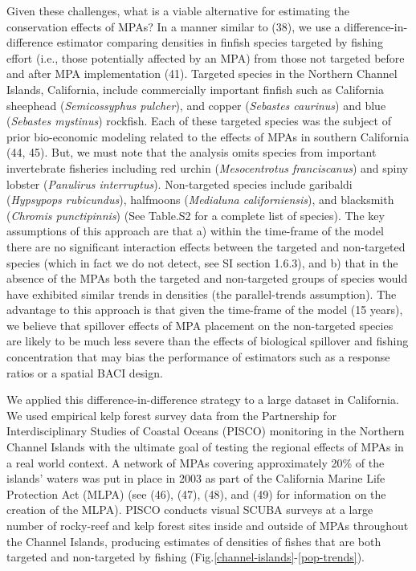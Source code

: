 \documentclass[9pt,twocolumn,twoside,lineno]{pnas-new}
\begin{document}
Given these challenges, what is a viable alternative for estimating the
conservation effects of MPAs? In a manner similar to (38), we use a
difference-in-difference estimator comparing densities in finfish
species targeted by fishing effort (i.e., those potentially affected by
an MPA) from those not targeted before and after MPA implementation
(41). Targeted species in the Northern Channel Islands, California,
include commercially important finfish such as California sheephead
(\emph{Semicossyphus pulcher}), and copper (\emph{Sebastes caurinus})
and blue (\emph{Sebastes mystinus}) rockfish. Each of these targeted
species was the subject of prior bio-economic modeling related to the
effects of MPAs in southern California (44, 45). But, we must note that
the analysis omits species from important invertebrate fisheries
including red urchin (\emph{Mesocentrotus franciscanus}) and spiny
lobster (\emph{Panulirus interruptus}). Non-targeted species include
garibaldi (\emph{Hypsypops rubicundus}), halfmoons (\emph{Medialuna
californiensis}), and blacksmith (\emph{Chromis punctipinnis}) (See
Table.S2 for a complete list of species). The key assumptions of this
approach are that a) within the time-frame of the model there are no
significant interaction effects between the targeted and non-targeted
species (which in fact we do not detect, see SI section 1.6.3), and b)
that in the absence of the MPAs both the targeted and non-targeted
groups of species would have exhibited similar trends in densities (the
parallel-trends assumption). The advantage to this approach is that
given the time-frame of the model (15 years), we believe that spillover
effects of MPA placement on the non-targeted species are likely to be
much less severe than the effects of biological spillover and fishing
concentration that may bias the performance of estimators such as a
response ratios or a spatial BACI design.

We applied this difference-in-difference strategy to a large dataset in
California. We used empirical kelp forest survey data from the
Partnership for Interdisciplinary Studies of Coastal Oceans (PISCO)
monitoring in the Northern Channel Islands with the ultimate goal of
testing the regional effects of MPAs in a real world context. A network
of MPAs covering approximately 20\% of the islands' waters was put in
place in 2003 as part of the California Marine Life Protection Act
(MLPA) (see (46), (47), (48), and (49) for information on the creation
of the MLPA). PISCO conducts visual SCUBA surveys at a large number of
rocky-reef and kelp forest sites inside and outside of MPAs throughout
the Channel Islands, producing estimates of densities of fishes that are
both targeted and non-targeted by fishing
(Fig.\ref{channel-islands}-\ref{pop-trends}).
\end{document}
